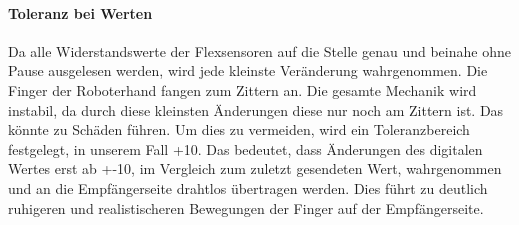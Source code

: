 \documentclass[titlepage,12pt,twoside]{article}
\begin{document}
\paragraph{Toleranz bei Werten}
\hfill \break
\hfill \break
Da alle Widerstandswerte der Flexsensoren auf die Stelle genau und beinahe ohne 
Pause ausgelesen werden, wird jede kleinste Veränderung wahrgenommen. Die 
Finger der Roboterhand fangen zum Zittern an. Die gesamte Mechanik wird instabil, 
da durch diese kleinsten Änderungen diese nur noch am Zittern ist. Das könnte 
zu Schäden führen. Um dies zu vermeiden, wird ein Toleranzbereich festgelegt, 
in unserem Fall +10. Das bedeutet, dass Änderungen des digitalen Wertes erst 
ab +-10, im Vergleich zum zuletzt gesendeten Wert, wahrgenommen und an die 
Empfängerseite drahtlos übertragen werden. Dies führt zu deutlich ruhigeren 
und realistischeren Bewegungen der Finger auf der Empfängerseite. \\
\\
\end{document}
